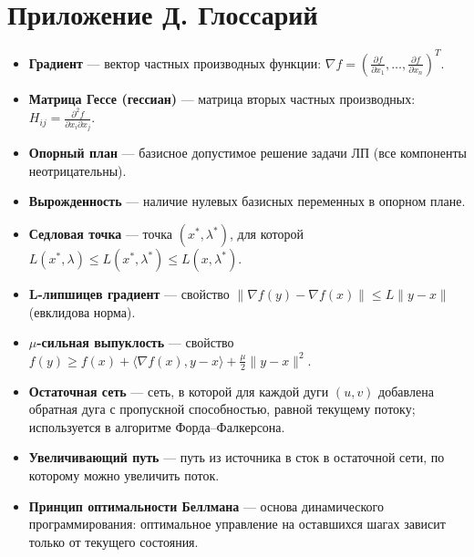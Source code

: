 \documentclass{article}
\theoremstyle{plain}
\begin{document}
\section*{Приложение Д. Глоссарий}

\begin{itemize}
  \item \textbf{Градиент} — вектор частных производных функции: $\nabla f = \left(\frac{\partial f}{\partial x_1},\dots,\frac{\partial f}{\partial x_n}\right)^T$.
  \item \textbf{Матрица Гессе (гессиан)} — матрица вторых частных производных: $H_{ij}=\frac{\partial^2 f}{\partial x_i\partial x_j}$.
  \item \textbf{Опорный план} — базисное допустимое решение задачи ЛП (все компоненты неотрицательны).
  \item \textbf{Вырожденность} — наличие нулевых базисных переменных в опорном плане.
  \item \textbf{Седловая точка} — точка $(x^*,\lambda^*)$, для которой $L(x^*,\lambda)\le L(x^*,\lambda^*)\le L(x,\lambda^*)$.
  \item \textbf{L-липшицев градиент} — свойство $\|\nabla f(y)-\nabla f(x)\|\le L\|y-x\|$ (евклидова норма).
  \item \textbf{$\mu$-сильная выпуклость} — свойство $f(y)\ge f(x)+\langle\nabla f(x),y-x\rangle+\frac{\mu}{2}\|y-x\|^2$.
  \item \textbf{Остаточная сеть} — сеть, в которой для каждой дуги $(u,v)$ добавлена обратная дуга с пропускной способностью, равной текущему потоку; используется в алгоритме Форда–Фалкерсона.
  \item \textbf{Увеличивающий путь} — путь из источника в сток в остаточной сети, по которому можно увеличить поток.
  \item \textbf{Принцип оптимальности Беллмана} — основа динамического программирования: оптимальное управление на оставшихся шагах зависит только от текущего состояния.
\end{itemize}
\end{document}
